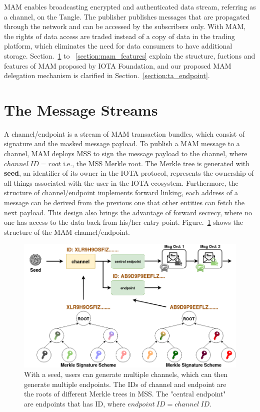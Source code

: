 \begin{spacing}{2.0}
\label{section:MAM}
MAM enables broadcasting encrypted and authenticated data stream, referring as a channel, on the Tangle. The publisher publishes messages that are propagated through the network and can be accessed by the subscribers only. With MAM, the rights of data access are traded instead of a copy of data in the trading platform, which eliminates the need for data consumers to have additional storage.
Section.~\ref{section:mam_streams} to ~\ref{section:mam_features} explain the structure, fuctions and features of MAM proposed by IOTA Foundation, and our proposed MAM delegation mechanism is clarified in Section.~\ref{section:ta_endpoint}.

\section{The Message Streams}
\label{section:mam_streams}
A channel/endpoint is a stream of MAM transaction bundles, which consist of signature and the masked message payload. To publish a MAM message to a channel, MAM deploys MSS to sign the message payload to the channel, where $channel\ ID = root$ i.e., the MSS Merkle root. The Merkle tree is generated with \textbf{seed}, an identifier of its owner in the IOTA protocol, represents the ownership of all things associated with the user in the IOTA ecosystem. Furthermore, the structure of channel/endpoint implements forward linking, each address of a message can be derived from the previous one that other entities can fetch the next payload. This design also brings the advantage of forward secrecy, where no one has access to the data back from his/her entry point. Figure.~\ref{fig:mam_structure} shows the structure of the MAM channel/endpoint.

\begin{figure}[h]
    \centering
    \includegraphics[width=5.5in]{img/mam_structure}
    \caption{With a seed, users can generate multiple channels, which can then generate multiple endpoints. The IDs of channel and endpoint are the roots of different Merkle trees in MSS. The "central endpoint" are endpoints that has ID, where $endpoint\ ID = channel\ ID$.}
    \label{fig:mam_structure}
\end{figure}
\clearpage


\end{spacing}
